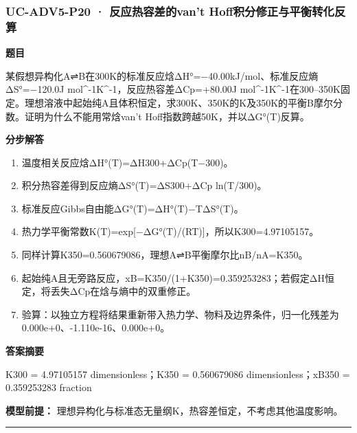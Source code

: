 \documentclass[UTF8,11pt,a4paper]{ctexart}
\begin{document}
\subsubsection*{UC-ADV5-P20 · 反应热容差的van’t Hoff积分修正与平衡转化反算}
\noindent\textbf{题目}\par
某假想异构化A⇌B在300K的标准反应焓ΔH°=−40.00kJ/mol、标准反应熵ΔS°=−120.0J mol\textasciicircum{}-1K\textasciicircum{}-1，反应热容差ΔCp=+80.00J mol\textasciicircum{}-1K\textasciicircum{}-1在300–350K固定。理想溶液中起始纯A且体积恒定，求300K、350K的K及350K的平衡B摩尔分数。证明为什么不能用常焓van’t Hoff指数跨越50K，并以ΔG°(T)反算。\par
\medskip\noindent\textbf{分步解答}
\begin{enumerate}
\item 温度相关反应焓ΔH°(T)=ΔH300+ΔCp(T−300)。
\item 积分热容差得到反应熵ΔS°(T)=ΔS300+ΔCp ln(T/300)。
\item 标准反应Gibbs自由能ΔG°(T)=ΔH°(T)−TΔS°(T)。
\item 热力学平衡常数K(T)=exp[−ΔG°(T)/(RT)]，所以K300=4.97105157。
\item 同样计算K350=0.560679086，理想A⇌B平衡摩尔比nB/nA=K350。
\item 起始纯A且无旁路反应，xB=K350/(1+K350)=0.359253283；若假定ΔH恒定，将丢失ΔCp在焓与熵中的双重修正。
\item 验算：以独立方程将结果重新带入热力学、物料及边界条件，归一化残差为 0.000e+0、-1.110e-16、0.000e+0。
\end{enumerate}
\noindent\textbf{答案摘要}\par
K300 = 4.97105157 dimensionless；K350 = 0.560679086 dimensionless；xB350 = 0.359253283 fraction\par
\noindent\textbf{模型前提：}
理想异构化与标准态无量纲K，热容差恒定，不考虑其他温度影响。\par
\medskip\hrule\medskip
{}
\end{document}
